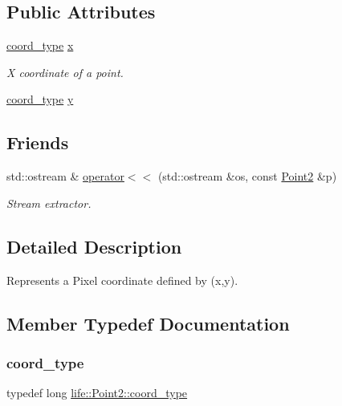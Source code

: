 \subsection*{Public Attributes}
\begin{DoxyCompactItemize}
\item 
\mbox{\hyperlink{structlife_1_1_point2_abc66c92a3ad99b7fb9d8c179213edf58}{coord\+\_\+type}} \mbox{\hyperlink{structlife_1_1_point2_af341f4da818e4699e52bb6e9bff041dd}{x}}
\begin{DoxyCompactList}\small\item\em X coordinate of a point. \end{DoxyCompactList}\item 
\mbox{\hyperlink{structlife_1_1_point2_abc66c92a3ad99b7fb9d8c179213edf58}{coord\+\_\+type}} \mbox{\hyperlink{structlife_1_1_point2_aeb68123ffdb09000bb989dd38bb37af7}{y}}
\end{DoxyCompactItemize}
\subsection*{Friends}
\begin{DoxyCompactItemize}
\item 
std\+::ostream \& \mbox{\hyperlink{structlife_1_1_point2_a5b7b94167b12e9f06dc3cdecf3d19c65}{operator$<$$<$}} (std\+::ostream \&os, const \mbox{\hyperlink{structlife_1_1_point2}{Point2}} \&p)
\begin{DoxyCompactList}\small\item\em Stream extractor. \end{DoxyCompactList}\end{DoxyCompactItemize}


\subsection{Detailed Description}
Represents a Pixel coordinate defined by {\ttfamily (x,y)}. 

\subsection{Member Typedef Documentation}
\mbox{\label{structlife_1_1_point2_abc66c92a3ad99b7fb9d8c179213edf58}} 
\subsubsection{\texorpdfstring{coord\_type}{coord\_type}}
{\footnotesize\ttfamily typedef long \mbox{\hyperlink{structlife_1_1_point2_abc66c92a3ad99b7fb9d8c179213edf58}{life\+::\+Point2\+::coord\+\_\+type}}}



